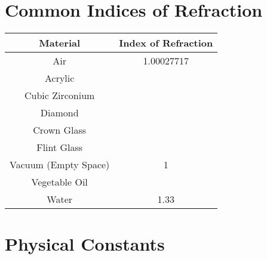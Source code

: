 \section{Common Indices of Refraction}
\begin{center}



	\begin{table}[h]
	\caption{\label{tab:refraction}Table of Common Indices of Refraction}
	
	\begin{longtable}{|c |c|}
		\hline
		\textbf{Material} & \textbf{Index of Refraction} \\
		\hline
		Air & 1.00027717 \\
		\hline
		Acrylic &  \\
		\hline
		Cubic Zirconium & \\
		\hline
		Diamond & \\
		\hline
		Crown Glass & \\
		\hline
		Flint Glass & \\
		\hline
		Vacuum (Empty Space) & 1 \\
		\hline
		Vegetable Oil & \\
		\hline
		Water & 1.33 \\		
		\hline

	\end{longtable}



\end{table}

\end{center}
\newpage






\section{Physical Constants}
